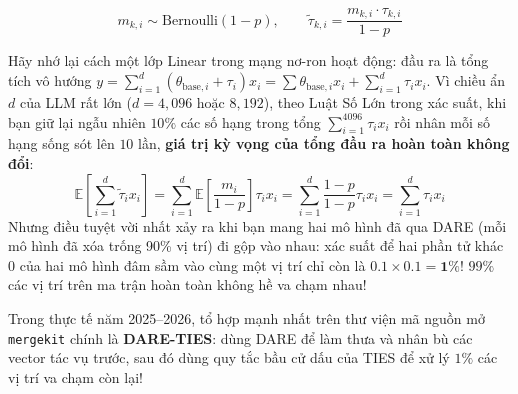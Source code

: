\begin{equation}
  m_{k, i} \sim \text{Bernoulli}(1 - p), \qquad \tilde{\tau}_{k, i} = \frac{m_{k, i} \cdot \tau_{k, i}}{1 - p}
  \label{eq:dare_formula}
\end{equation}

\begin{mentalmodel}
Hãy nhớ lại cách một lớp Linear trong mạng nơ-ron hoạt động: đầu ra là tổng tích vô hướng $y = \sum_{i=1}^{d} (\theta_{\text{base}, i} + \tau_i) x_i = \sum \theta_{\text{base}, i} x_i + \sum_{i=1}^{d} \tau_i x_i$.
Vì chiều ẩn $d$ của LLM rất lớn ($d = 4{,}096$ hoặc $8{,}192$), theo Luật Số Lớn trong xác suất, khi bạn giữ lại ngẫu nhiên $10\%$ các số hạng trong tổng $\sum_{i=1}^{4096} \tau_i x_i$ rồi nhân mỗi số hạng sống sót lên $10$ lần, \textbf{giá trị kỳ vọng của tổng đầu ra hoàn toàn không đổi}:
\begin{equation*}
  \mathbb{E}\left[ \sum_{i=1}^{d} \tilde{\tau}_i x_i \right] = \sum_{i=1}^{d} \mathbb{E}\left[\frac{m_i}{1 - p}\right] \tau_i x_i = \sum_{i=1}^{d} \frac{1 - p}{1 - p} \tau_i x_i = \sum_{i=1}^{d} \tau_i x_i
\end{equation*}
Nhưng điều tuyệt vời nhất xảy ra khi bạn mang hai mô hình đã qua DARE (mỗi mô hình đã xóa trống 90\% vị trí) đi gộp vào nhau: xác suất để hai phần tử khác $0$ của hai mô hình đâm sầm vào cùng một vị trí chỉ còn là $0.1 \times 0.1 = \mathbf{1\%}$! $99\%$ các vị trí trên ma trận hoàn toàn không hề va chạm nhau!
\end{mentalmodel}

Trong thực tế năm 2025--2026, tổ hợp mạnh nhất trên thư viện mã nguồn mở \texttt{mergekit} chính là \textbf{DARE-TIES}: dùng DARE để làm thưa và nhân bù các vector tác vụ trước, sau đó dùng quy tắc bầu cử dấu của TIES để xử lý $1\%$ các vị trí va chạm còn lại!
